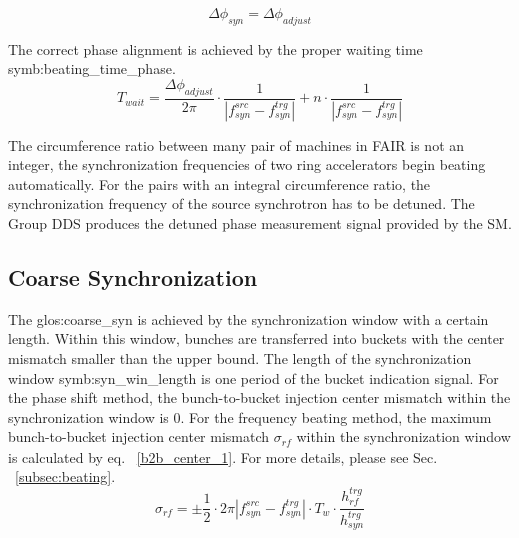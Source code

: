 \begin{equation}
\Delta \phi_\mathit{syn}=\Delta \phi_\mathit{adjust} 
\end{equation}

The correct phase alignment is achieved by the proper waiting time \gls{symb:beating_time_phase}.
\begin{equation}
T_\mathit{wait}= \frac{\Delta \phi_\mathit{adjust}}{2\pi}\cdot\frac{1}{|f_{\mathit{syn}}^\mathit{src}-f_{\mathit{syn}}^\mathit{trg}|}+n\cdot \frac{1}{|f_{\mathit{syn}}^\mathit{src}-f_{\mathit{syn}}^\mathit{trg}|}
\end{equation}

The circumference ratio between many pair of machines in FAIR is not an integer, the synchronization frequencies of two ring accelerators begin beating automatically. For the pairs with an integral circumference ratio, the synchronization frequency of the source synchrotron has to be detuned. The Group DDS produces the detuned phase measurement signal provided by the SM. 



\subsection{Coarse Synchronization}

The \gls{glos:coarse_syn} is achieved by the synchronization window with a certain length. Within this window, bunches are transferred into buckets with the center mismatch smaller than the upper bound. The length of the synchronization window \gls{symb:syn_win_length} is one period of the bucket indication signal. For the phase shift method, the bunch-to-bucket injection center mismatch within the synchronization window is $0$. For the frequency beating method, the maximum bunch-to-bucket injection center mismatch $\sigma_\mathit{rf}$ within the synchronization window is calculated by eq. ~\ref{b2b_center_1}. For more details, please see Sec. ~\ref{subsec:beating}.
\begin{equation}
\sigma_\mathit{rf}=\pm \frac{1}{2}\cdot 2\pi|f_{\mathit{syn}}^\mathit{src}-f_{\mathit{syn}}^\mathit{trg}|\cdot T_\mathit{w} \cdot \frac{h_{\mathit{rf}}^\mathit{trg}}{h_{\mathit{syn}}^\mathit{trg}}
\label{b2b_center_1}
\end{equation}

